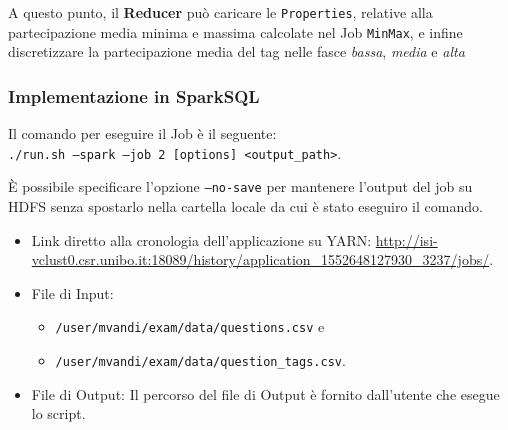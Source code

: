 \documentclass[10pt]{article}
\begin{document}
A questo punto, il \textbf{Reducer} può caricare le \texttt{Properties}, relative alla partecipazione media minima e massima calcolate nel Job \texttt{MinMax}, e infine discretizzare la partecipazione media del tag nelle fasce \textit{bassa}, \textit{media} e \textit{alta}

\begin{comment}

Please provide:
\begin{itemize}
\item Description of the implementation. A schematic and concise discussion is preferrable to a verbose narrative. Focus on how the data is manipulated in the job (e.g., what do keys and values represent across the different stages, what operations are carried out). 
\item Performance considerations with respect the (potentially) carried out optimizations, e.g., in terms of:
\begin{itemize}
\item allocated resources and tasks;
\item enforced partitioning;
\item data caching;
\item combiner usage;
\item broadcast variables usage;
\item any other kind of optimization.
\end{itemize}
\item Short extract of the output and discussion (i.e., whether there is any relevant insight obtained).
\end{itemize}

\end{comment}

\subsubsection{Implementazione in SparkSQL}
Il comando per eseguire il Job è il seguente:\\
\texttt{./run.sh --spark --job 2 [options] <output\_path>}.

\`E possibile specificare l'opzione \texttt{--no-save} per mantenere l'output del job su HDFS senza spostarlo nella cartella locale da cui è stato eseguiro il comando.

\begin{itemize}
\item Link diretto alla cronologia dell'applicazione su YARN: \url{http://isi-vclust0.csr.unibo.it:18089/history/application_1552648127930_3237/jobs/}.
\item File di Input:
\begin{itemize}
\item \texttt{/user/mvandi/exam/data/questions.csv} e\\
\item \texttt{/user/mvandi/exam/data/question\_tags.csv}.
\end{itemize}
\item File di Output: Il percorso del file di Output è fornito dall'utente che esegue lo script.
\end{itemize}
\end{document}
